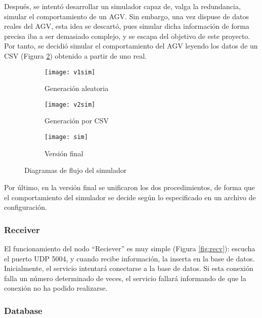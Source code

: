 Después, se intentó desarrollar un simulador capaz de, valga la redundancia, simular el comportamiento de un AGV. Sin
embargo, una vez dispuse de datos reales del AGV, esta idea se descartó, pues simular dicha información de forma
precisa iba a ser demasiado complejo, y se escapa del objetivo de este proyecto. Por tanto, se decidió simular el
comportamiento del AGV leyendo los datos de un CSV (Figura \ref{fig:v2sim}) obtenido a partir de uno real.

\begin{figure}
    \centering
    \begin{subfigure}[b]{0.45\textwidth}
        \centering
        \texttt{[image: v1sim]}
        \caption{Generación aleatoria}
        \label{fig:v1sim}
    \end{subfigure}
    \hfill
    \begin{subfigure}[b]{0.45\textwidth}
        \centering
        \texttt{[image: v2sim]}
        \caption{Generación por CSV}
        \label{fig:v2sim}
    \end{subfigure}
    \begin{subfigure}[b]{0.7\textwidth}
        \centering
        \texttt{[image: sim]}
        \caption{Versión final}
        \label{fig:sim}
    \end{subfigure}
    \caption{Diagramas de flujo del simulador}
    \label{fig:diagsim}
\end{figure}

Por último, en la versión final se unificaron los dos procedimientos, de forma que el comportamiento del simulador
se decide según lo especificado en un archivo de configuración.

\subsubsection{Receiver}

El funcionamiento del nodo ``Reciever'' es muy simple (Figura \ref{fig:recv}): escucha el puerto UDP 5004, y cuando recibe información, la inserta 
en la base de datos. Inicialmente, el servicio intentará conectarse a la base de datos. Si esta conexión falla un número
determinado de veces, el servicio fallará informando de que la conexión no ha podido realizarse.


\subsubsection{Database}

